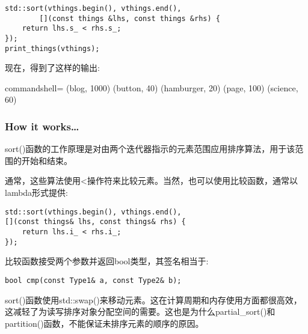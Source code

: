 \begin{itemize}
\begin{lstlisting}[style=styleCXX]
std::sort(vthings.begin(), vthings.end(),
		[](const things &lhs, const things &rhs) {
	return lhs.s_ < rhs.s_;
});
print_things(vthings);
\end{lstlisting}

现在，得到了这样的输出:

\begin{tcblisting}{commandshell={}}
(blog, 1000) (button, 40) (hamburger, 20) (page, 100)
(science, 60)
\end{tcblisting}

\end{itemize}

\subsubsection{How it works…}

sort()函数的工作原理是对由两个迭代器指示的元素范围应用排序算法，用于该范围的开始和结束。

通常，这些算法使用<操作符来比较元素。当然，也可以使用比较函数，通常以lambda形式提供:

\begin{lstlisting}[style=styleCXX]
std::sort(vthings.begin(), vthings.end(),
[](const things& lhs, const things& rhs) {
	return lhs.i_ < rhs.i_;
});
\end{lstlisting}

比较函数接受两个参数并返回bool类型，其签名相当于:

\begin{lstlisting}[style=styleCXX]
bool cmp(const Type1& a, const Type2& b);
\end{lstlisting}

sort()函数使用std::swap()来移动元素。这在计算周期和内存使用方面都很高效，这减轻了为读写排序对象分配空间的需要。这也是为什么partial\_sort()和partition()函数，不能保证未排序元素的顺序的原因。











